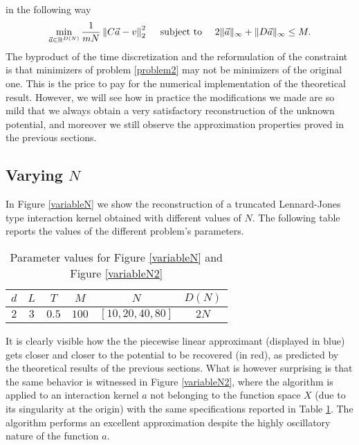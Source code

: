 in the following way
\begin{align}\label{problem2}
\min_{\vec{a} \in \mathbb{R}^{D(N)}} \frac{1}{mN} \left\| C \vec{a} - v \right\|^2_{2} \quad \text{ subject to } \quad 2\|\vec{a}\|_{\infty} + \|D\vec{a}\|_{\infty} \leq M.
\end{align}
The byproduct of the time discretization and the reformulation of the constraint is that minimizers of problem \eqref{problem2} may not be minimizers of the original one. This is the price to pay for the numerical implementation of the theoretical result. However, we will see how in practice the modifications we made are so mild that we always obtain a very satisfactory reconstruction of the unknown potential, and moreover we still observe the approximation properties proved in the previous sections.

\subsection{Varying $N$}

In Figure \ref{variableN} we show the reconstruction of a truncated Lennard-Jones type interaction kernel obtained with different values of $N$. The following table reports the values of the different problem's parameters.

\begin{table}[h]
\begin{center}
\begin{tabular}{ |c|c|c|c|c|c| }
\hline
  $d$ & $L$ & $T$ & $M$ & $N$ & $D(N)$ \\
\hline
\hline
  $2$ & $3$ & $0.5$ & $100$ & $[10,20,40,80]$ & $2N$ \\
\hline
\end{tabular}
\end{center}
\vspace{-0.5cm}
\caption{Parameter values for Figure \ref{variableN} and Figure \ref{variableN2}} \label{tab:fig1} 
\end{table}

It is clearly visible how the the piecewise linear approximant (displayed in blue) gets closer and closer to the potential to be recovered (in red), as predicted by the theoretical results of the previous sections. What is however surprising is that the same behavior is witnessed in Figure \ref{variableN2}, where the algorithm is applied to an interaction kernel $a$ not belonging to the function space $X$ (due to its singularity at the origin) with the same specifications reported in Table \ref{tab:fig1}. The algorithm performs an excellent approximation despite the highly oscillatory nature of the function $a$.

